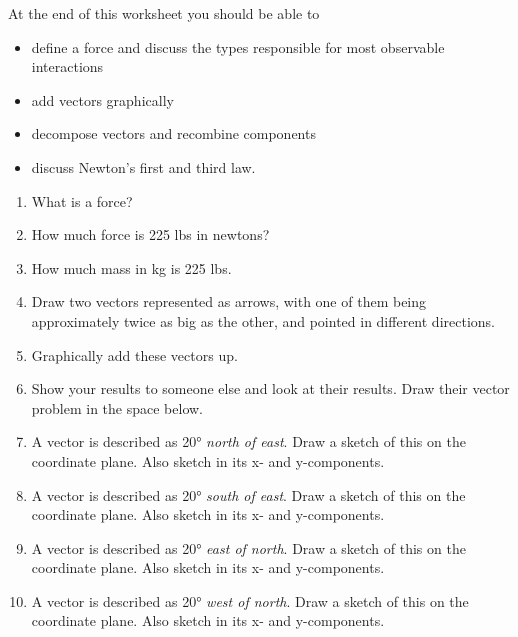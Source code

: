 At the end of this worksheet you should be able to  
\begin{itemize}
	\item define a force and discuss the types responsible for most observable interactions
	\item add vectors graphically
	\item decompose vectors and recombine components
	\item discuss Newton's first and third law.

\end{itemize}


\begin{enumerate}
\setlength\itemsep{1 in}


\item
What is a force?

\item
How much force is 225 lbs in newtons?

\item 
How much mass in kg is 225 lbs.

\item 
Draw two vectors represented as arrows, with one of them being approximately twice as big as the other, and pointed in different directions.
\hugeskip

\item 
Graphically add these vectors up.
\hugeskip	

\item Show your results to someone else and look at their results. Draw their vector problem in the space below.
\hugeskip

\item 
A vector is described as \ang{20} \emph{north of east}. Draw a sketch of this on the coordinate plane. Also sketch in its x- and y-components. 
\giantskip

\item 
A vector is described as \ang{20} \emph{south of east}. Draw a sketch of this on the coordinate plane. Also sketch in its x- and y-components. 
\giantskip

\item 
A vector is described as \ang{20} \emph{east of north}. Draw a sketch of this on the coordinate plane. Also sketch in its x- and y-components. 
\giantskip

\item 
A vector is described as \ang{20} \emph{west of north}. Draw a sketch of this on the coordinate plane. Also sketch in its x- and y-components. 
\giantskip


\end{enumerate}
